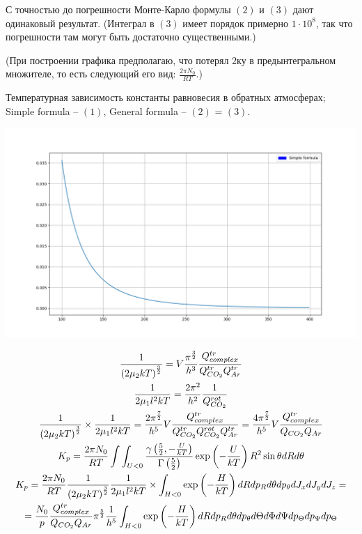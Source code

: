 \documentclass[14pt]{article}
\newcommand{\lb}{\left(}
\newcommand{\rb}{\right)}
\begin{document}
\vspace{0.3cm}
С точностью до погрешности Монте-Карло формулы $(2)$ и $(3)$ дают одинаковый результат. (Интеграл в $(3)$ имеет порядок примерно $1 \cdot 10^8$, так что погрешности там могут быть достаточно существенными.)

(При построении графика предполагаю, что потерял $2$ку в предынтегральном множителе, то есть следующий его вид: $\frac{2 \pi N_0}{RT}$.) 

Температурная зависимость константы равновесия в обратных атмосферах; Simple formula -- $(1)$, General formula -- $(2)$ = $(3)$.

\includegraphics[scale=0.5]{plot.png}

\newpage

\begin{gather}
	\frac{1}{\lb 2 \mu_2 k T \rb^{\frac{3}{2}}} = V \frac{\pi^{\frac{3}{2}}}{h^3} \frac{Q_{complex}^{tr}}{Q_{CO_2}^{tr} Q_{Ar}^{tr}} \notag \\
	\frac{1}{2 \mu_1 l^2 k T} = \frac{2 \pi^2}{h^2} \frac{1}{Q_{CO_2}^{rot}} \notag \\
	\frac{1}{\lb 2 \mu_2 k T \rb^{\frac{3}{2}}} \times \frac{1}{2 \mu_1 l^2 k T} = \frac{2 \pi^{\frac{7}{2}}}{h^5} V \frac{Q_{complex}^{tr}}{Q_{CO_2}^{tr} Q_{CO_2}^{rot} Q_{Ar}^{tr}} = \frac{4 \pi^{\frac{7}{2}}}{h^5} V \frac{Q_{complex}^{tr}}{Q_{CO_2} Q_{Ar}} \notag \\
	K_p = \frac{2 \pi N_0}{RT} \int \int_{U < 0} \frac{\gamma \lb \frac{5}{2} , - \frac{U}{kT} \rb }{\Gamma \lb \frac{5}{2} \rb} \exp \lb - \frac{U}{kT} \rb R^2 \sin \theta dR d\theta \notag \\
	K_p = \frac{2 \pi N_0}{RT}  \frac{1}{\lb 2 \mu_2 k T \rb^{\frac{3}{2}}} \frac{1}{2 \mu_1 l^2 k T} \times \int_{H < 0} \exp \lb - \frac{H}{kT} \rb dR dp_R d\theta dp_\theta dJ_x dJ_y dJ_z = \notag \\
	= \frac{N_0}{p} \frac{Q_{complex}^{tr}}{Q_{CO_2} Q_{Ar}} \pi^\frac{5}{2} \frac{1}{h^5} \int_{H < 0} \exp \lb - \frac{H}{kT} \rb dR dp_R d\theta dp_\theta d\Theta d\Phi d\Psi dp_\Theta dp_\Psi dp_\Theta \notag
\end{gather}
\end{document}
